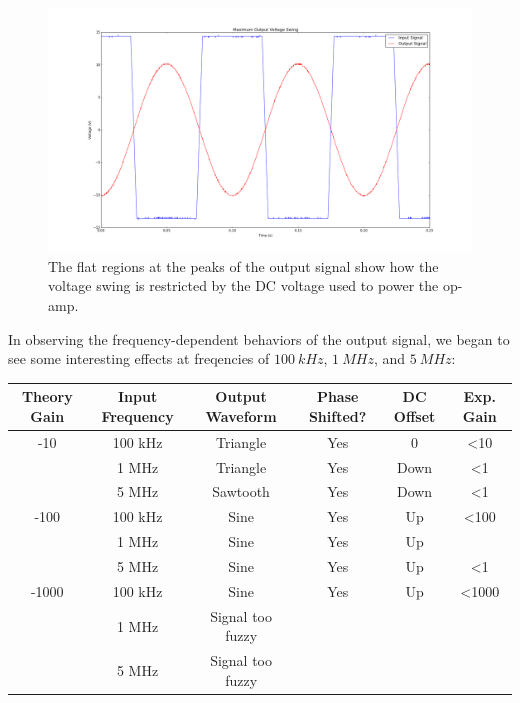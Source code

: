 \documentclass[11pt]{article}
\begin{document}
\begin{figure}[H]
    \centering
    \includegraphics[scale=0.3]{Plots/figB.png}
    \caption{The flat regions at the peaks of the output signal show how the voltage swing is restricted by the DC voltage used to power the op-amp.}
    \label{fig:b}
\end{figure}

In observing the frequency-dependent behaviors of the output signal, we began to see some interesting effects at freqencies of $100\ kHz$, $1\ MHz$, and $5\ MHz$:\\

\begin{center}
    \begin{tabular}[H]{ | c | c | c | c | c | c | }
        \hline
        Theory Gain & Input Frequency & Output Waveform & Phase Shifted? & DC Offset & Exp. Gain \\ \hline
        -10 & 100 kHz & Triangle & Yes & 0 & \textless 10 \\ \hline
        & 1 MHz & Triangle & Yes & Down & \textless 1 \\ \hline
        & 5 MHz & Sawtooth & Yes & Down & \textless 1 \\ \hline
        -100 & 100 kHz & Sine & Yes & Up & \textless 100 \\ \hline
        & 1 MHz & Sine & Yes & Up & \approx 1 \\ \hline
        & 5 MHz & Sine & Yes & Up & \textless 1 \\ \hline
        -1000 & 100 kHz & Sine & Yes & Up & \textless 1000 \\ \hline
        & 1 MHz & Signal too fuzzy & & & \\ \hline
        & 5 MHz & Signal too fuzzy & & & \\ \hline
    \end{tabular}
\end{center}
\end{document}
